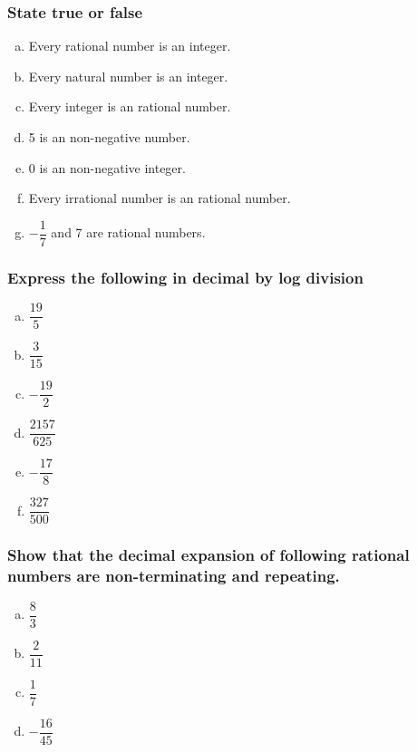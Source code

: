 \documentclass[a4paper,10pt]{article}
\begin{document}
\subsubsection{State true or false}
\begin{enumerate}[a.]
\item Every rational number is an integer.
\item Every natural number is an integer.
\item Every integer is an rational number.
\item 5 is an non-negative number.
\item 0 is an non-negative integer.
\item Every irrational number is an rational number.
\item $-\dfrac{1}{7}$ and 7 are rational numbers.
\end{enumerate}
\subsubsection{Express the following in decimal by log division}
\begin{multicols}{5}
\begin{enumerate}[a.]
\item $\dfrac{19}{5}$
\item $\dfrac{3}{15}$
\item $-\dfrac{19}{2}$
\item $\dfrac{2157}{625}$
\item $-\dfrac{17}{8}$
\item $\dfrac{327}{500}$
\end{enumerate}
\end{multicols}
\subsubsection{Show that the decimal expansion of following rational
numbers are non-terminating and
repeating.}
\begin{multicols}{4}
\begin{enumerate}[a.]
 \item $\dfrac{8}{3}$
 \item $\dfrac{2}{11}$
 \item $\dfrac{1}{7}$
 \item $-\dfrac{16}{45}$
\end{enumerate}
\end{multicols}
\end{document}
